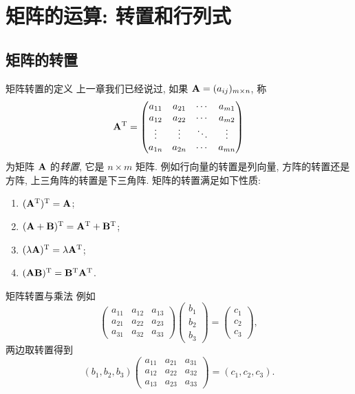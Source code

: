 \section{矩阵的运算: 转置和行列式}

\subsection{矩阵的转置}

\begin{frame}{矩阵转置的定义}
	\onslide<+->
	上一章我们已经说过, 如果 ${\mathbf{A}}=(a_{ij})_{m\times n}$, 称
	\[{\mathbf{A}}^{\mathrm{T}}=\begin{pmatrix}
		a_{11}&a_{21}&\cdots&a_{m1}\\
		a_{12}&a_{22}&\cdots&a_{m2}\\
		\vdots&\vdots&\ddots&\vdots\\
		a_{1n}&a_{2n}&\cdots&a_{mn}
	\end{pmatrix}\]
	为矩阵 ${\mathbf{A}}$ 的\emph{转置}, 它是 $n\times m$ 矩阵.
	\onslide<+->
	例如行向量的转置是列向量, 方阵的转置还是方阵, 上三角阵的转置是下三角阵.
	\onslide<+->
	矩阵的转置满足如下性质:
	\begin{enumerate}
		\item $({\mathbf{A}}^{\mathrm{T}})^{\mathrm{T}}={\mathbf{A}}$;
		\item $({\mathbf{A}}+{\mathbf{B}})^{\mathrm{T}}={\mathbf{A}}^{\mathrm{T}}+{\mathbf{B}}^{\mathrm{T}}$;
		\item $(\lambda{\mathbf{A}})^{\mathrm{T}}=\lambda{\mathbf{A}}^{\mathrm{T}}$;
		\item \alert{$({\mathbf{A}}{\mathbf{B}})^{\mathrm{T}}={\mathbf{B}}^{\mathrm{T}}{\mathbf{A}}^{\mathrm{T}}$}.
	\end{enumerate}
\end{frame}


\begin{frame}{矩阵转置与乘法}
	\onslide<+->
	例如
	\[\begin{pmatrix}
		a_{11}&a_{12}&a_{13}\\
		a_{21}&a_{22}&a_{23}\\
		a_{31}&a_{32}&a_{33}
	\end{pmatrix}\begin{pmatrix}
		b_1\\b_2\\b_3
	\end{pmatrix}=\begin{pmatrix}
		c_1\\c_2\\c_3
	\end{pmatrix},\]
	\onslide<+->
	两边取转置得到
	\[(b_1,b_2,b_3)\begin{pmatrix}
		a_{11}&a_{21}&a_{31}\\
		a_{12}&a_{22}&a_{32}\\
		a_{13}&a_{23}&a_{33}
	\end{pmatrix}=(c_1,c_2,c_3).\]
\end{frame}


